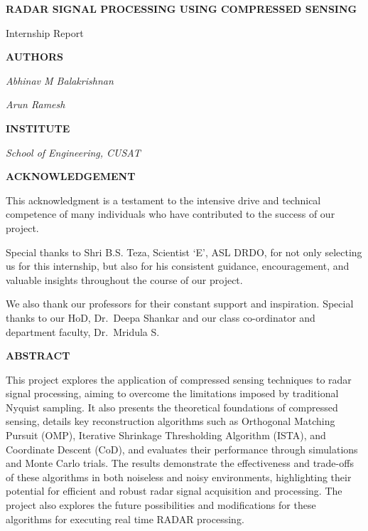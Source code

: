 \documentclass[
  letterpaper,
  DIV=11,
  numbers=noendperiod]{scrartcl}
\author{}
\date{}
\providecommand{\mainsection}[1]{\begin{center}{\rmfamily\textbf{\fontsize{14}{20}\selectfont #1}}\end{center}}
\begin{document}
\begin{titlepage}
\centering
\vspace*{2cm}
\vspace{1cm}
{\selectfont
{\Huge\bfseries RADAR SIGNAL PROCESSING USING COMPRESSED SENSING \par}
\vspace{0.5cm}
{\Large Internship Report \par}
\vspace{2cm}
{\large\bfseries AUTHORS\par}
{\large\itshape Abhinav M Balakrishnan\par}
{\large\itshape Arun Ramesh\par}
\vspace{2cm}
{\large\bfseries INSTITUTE\par}
{\large\itshape School of Engineering, CUSAT\par}
\vspace{2cm}
}
\vfill
\end{titlepage}
\clearpage


\newpage
\mainsection{ACKNOWLEDGEMENT}

This acknowledgment is a testament to the intensive drive and technical
competence of many individuals who have contributed to the success of
our project.

Special thanks to Shri B.S. Teza, Scientist `E', ASL DRDO, for not only
selecting us for this internship, but also for his consistent guidance,
encouragement, and valuable insights throughout the course of our
project.

We also thank our professors for their constant support and inspiration.
Special thanks to our HoD, Dr.~Deepa Shankar and our class co-ordinator
and department faculty, Dr.~Mridula S.

\newpage

\mainsection{ABSTRACT}

This project explores the application of compressed sensing techniques
to radar signal processing, aiming to overcome the limitations imposed
by traditional Nyquist sampling. It also presents the theoretical
foundations of compressed sensing, details key reconstruction algorithms
such as Orthogonal Matching Pursuit (OMP), Iterative Shrinkage
Thresholding Algorithm (ISTA), and Coordinate Descent (CoD), and
evaluates their performance through simulations and Monte Carlo trials.
The results demonstrate the effectiveness and trade-offs of these
algorithms in both noiseless and noisy environments, highlighting their
potential for efficient and robust radar signal acquisition and
processing. The project also explores the future possibilities and
modifications for these algorithms for executing real time RADAR
processing.
\end{document}
